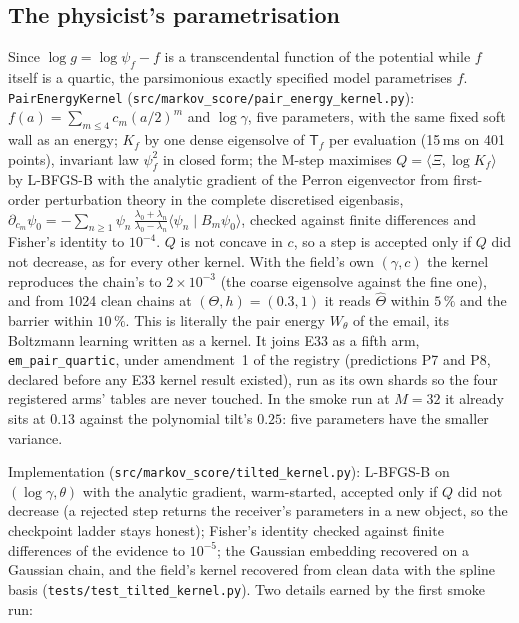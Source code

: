 \documentclass[10pt,a4paper]{article}
\newcommand{\Th}{\Theta}
\newcommand{\code}[1]{\texttt{\small #1}}
\theoremstyle{plain}
\theoremstyle{remark}
\begin{document}
\subsection{The physicist's parametrisation}\label{sec:pair}
Since $\log g=\log\psi_f-f$ is a transcendental function of the potential while $f$ itself is a
quartic, the parsimonious exactly specified model parametrises $f$. \code{PairEnergyKernel}
(\code{src/markov\_score/pair\_energy\_kernel.py}): $f(a)=\sum_{m\le4}c_m(a/2)^m$ and $\log\gamma$, five
parameters, with the same fixed soft wall as an energy; $K_f$ by one dense eigensolve of $\mathsf T_f$
per evaluation (15\,ms on 401 points), invariant law $\psi_f^2$ in closed form; the M-step maximises
$Q=\langle\Xi,\log K_f\rangle$ by L-BFGS-B with the analytic gradient of the Perron eigenvector from
first-order perturbation theory in the complete discretised eigenbasis,
$\partial_{c_m}\psi_0=-\sum_{n\ge1}\psi_n\,\frac{\lambda_0+\lambda_n}{\lambda_0-\lambda_n}\langle\psi_n\mid B_m\psi_0\rangle$,
checked against finite differences and Fisher's identity to $10^{-4}$. $Q$ is not concave in $c$, so a
step is accepted only if $Q$ did not decrease, as for every other kernel. With the field's own
$(\gamma,c)$ the kernel reproduces the chain's to $2\times10^{-3}$ (the coarse eigensolve against the
fine one), and from 1024 clean chains at $(\Th,h)=(0.3,1)$ it reads $\hat\Th$ within $5\,\%$ and the
barrier within $10\,\%$. This is literally the pair energy $W_\theta$ of the email, its Boltzmann learning
written as a kernel. It joins E33 as a fifth arm, \code{em\_pair\_quartic}, under amendment~1 of the
registry (predictions P7 and P8, declared before any E33 kernel result existed), run as its own
shards so the four registered arms' tables are never touched. In the smoke run at $M=32$ it already
sits at $0.13$ against the polynomial tilt's $0.25$: five parameters have the smaller variance.

Implementation (\code{src/markov\_score/tilted\_kernel.py}): L-BFGS-B on $(\log\gamma,\theta)$ with the
analytic gradient, warm-started, accepted only if $Q$ did not decrease (a rejected step returns the
receiver's parameters in a new object, so the checkpoint ladder stays honest); Fisher's identity
checked against finite differences of the evidence to $10^{-5}$; the Gaussian embedding recovered
on a Gaussian chain, and the field's kernel recovered from clean data with the spline basis
(\code{tests/test\_tilted\_kernel.py}). Two details earned by the first smoke run:
\end{document}
